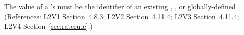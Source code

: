The value of a \RateRule's  must be the identifier
of an existing \Compartment, \Species, or globally-defined \Parameter.
(References: L2V1 Section~4.8.3; L2V2 Section~4.11.4; L2V3
Section~4.11.4; L2V4 Section~\ref{sec:raterule}.)
